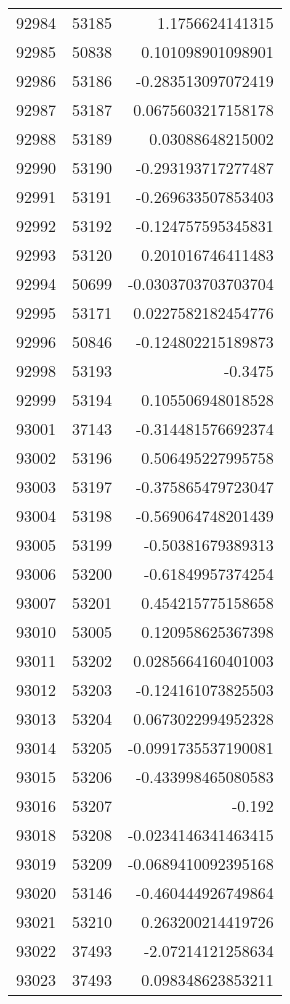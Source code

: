 \begin{tabular}{r | r | r}
92984 & 53185 & 1.1756624141315 \\
92985 & 50838 & 0.101098901098901 \\
92986 & 53186 & -0.283513097072419 \\
92987 & 53187 & 0.0675603217158178 \\
92988 & 53189 & 0.03088648215002 \\
92990 & 53190 & -0.293193717277487 \\
92991 & 53191 & -0.269633507853403 \\
92992 & 53192 & -0.124757595345831 \\
92993 & 53120 & 0.201016746411483 \\
92994 & 50699 & -0.0303703703703704 \\
92995 & 53171 & 0.0227582182454776 \\
92996 & 50846 & -0.124802215189873 \\
92998 & 53193 & -0.3475 \\
92999 & 53194 & 0.105506948018528 \\
93001 & 37143 & -0.314481576692374 \\
93002 & 53196 & 0.506495227995758 \\
93003 & 53197 & -0.375865479723047 \\
93004 & 53198 & -0.569064748201439 \\
93005 & 53199 & -0.50381679389313 \\
93006 & 53200 & -0.61849957374254 \\
93007 & 53201 & 0.454215775158658 \\
93010 & 53005 & 0.120958625367398 \\
93011 & 53202 & 0.0285664160401003 \\
93012 & 53203 & -0.124161073825503 \\
93013 & 53204 & 0.0673022994952328 \\
93014 & 53205 & -0.0991735537190081 \\
93015 & 53206 & -0.433998465080583 \\
93016 & 53207 & -0.192 \\
93018 & 53208 & -0.0234146341463415 \\
93019 & 53209 & -0.0689410092395168 \\
93020 & 53146 & -0.460444926749864 \\
93021 & 53210 & 0.263200214419726 \\
93022 & 37493 & -2.07214121258634 \\
93023 & 37493 & 0.098348623853211 \\

\end{tabular}

